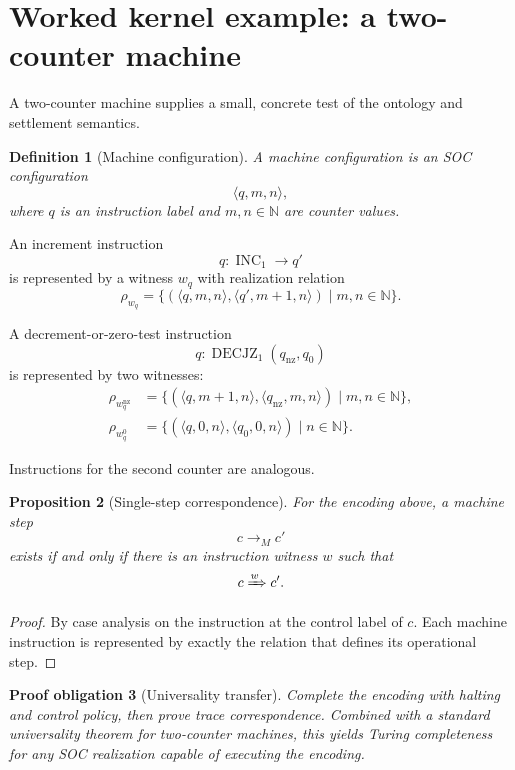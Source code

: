 \documentclass[11pt]{article}
\newtheorem{definition}{Definition}[section]
\newtheorem{proposition}[definition]{Proposition}
\newtheorem{obligation}[definition]{Proof obligation}
\theoremstyle{remark}
\newcommand{\realizes}[1]{\xRightarrow{#1}}
\begin{document}
\section{Worked kernel example: a two-counter machine}

A two-counter machine supplies a small, concrete test of the ontology and
settlement semantics.

\begin{definition}[Machine configuration]
A machine configuration is an SOC configuration
\[
  \langle q,m,n\rangle,
\]
where $q$ is an instruction label and $m,n\in\mathbb{N}$ are counter values.
\end{definition}

An increment instruction
\[
  q:\operatorname{INC}_1\to q'
\]
is represented by a witness $w_q$ with realization relation
\[
  \rho_{w_q}
  =
  \{
    (\langle q,m,n\rangle,\langle q',m+1,n\rangle)
    \mid m,n\in\mathbb{N}
  \}.
\]

A decrement-or-zero-test instruction
\[
  q:\operatorname{DECJZ}_1(q_{\mathrm{nz}},q_0)
\]
is represented by two witnesses:
\[
\begin{aligned}
  \rho_{w_q^{\mathrm{nz}}}
  &=
  \{
    (\langle q,m+1,n\rangle,
     \langle q_{\mathrm{nz}},m,n\rangle)
    \mid m,n\in\mathbb{N}
  \},\\
  \rho_{w_q^{0}}
  &=
  \{
    (\langle q,0,n\rangle,
     \langle q_0,0,n\rangle)
    \mid n\in\mathbb{N}
  \}.
\end{aligned}
\]

Instructions for the second counter are analogous.

\begin{proposition}[Single-step correspondence]
For the encoding above, a machine step
\[
  c\to_M c'
\]
exists if and only if there is an instruction witness $w$ such that
\[
  c\realizes{w}c'.
\]
\end{proposition}

\begin{proof}
By case analysis on the instruction at the control label of $c$. Each machine
instruction is represented by exactly the relation that defines its
operational step.
\end{proof}

\begin{obligation}[Universality transfer]
Complete the encoding with halting and control policy, then prove trace
correspondence. Combined with a standard universality theorem for two-counter
machines, this yields Turing completeness for any SOC realization capable of
executing the encoding.
\end{obligation}
\end{document}
